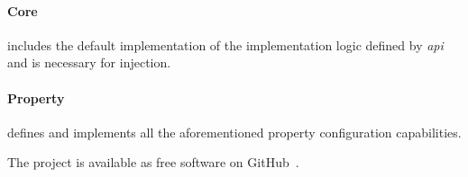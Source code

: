 	\paragraph{Core} includes the default implementation of the implementation logic defined by \emph{api} and is necessary for injection.
	
	\paragraph{Property} defines and implements all the aforementioned property configuration capabilities.
	
	The project is available as free software on GitHub~\cite{Kreator}.	
	
%













